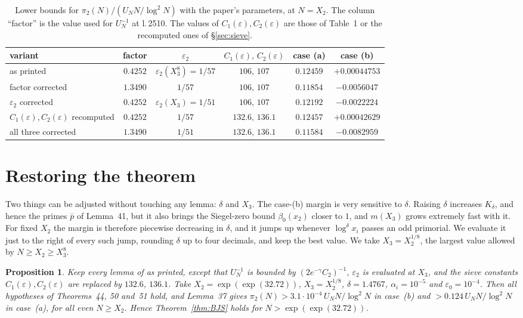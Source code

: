 \documentclass[11pt,a4paper]{amsart}
\newtheorem{proposition}[theorem]{Proposition}
\theoremstyle{remark}
\newcommand{\eps}{\varepsilon}
\newcommand{\BJS}{\cite{BJS}}
\begin{document}
\begin{table}[ht]
\caption{Lower bounds for $\pi_2(N)/(U_NN/\log^2N)$ with the paper's parameters, at $N=X_2$. The column
``factor'' is the value used for $U_N^{-1}$ at l.\,2510. The values of $C_1(\eps),C_2(\eps)$ are those of
Table~1 or the recomputed ones of \S\ref{sec:sieve}.}
\label{tab:variants}
\centering\small
\begin{tabular}{@{}lccccc@{}}
\toprule
variant & factor & $\eps_2$ & $C_1(\eps),\,C_2(\eps)$ & case (a) & case (b) \\
\midrule
as printed & $0.4252$ & $\eps_2(X_3^8)=1/57$ & $106,\,107$ & $0.12459$ & $+0.00044753$ \\
factor corrected & $1.3490$ & $1/57$ & $106,\,107$ & $0.11854$ & $-0.0056047$ \\
$\eps_2$ corrected & $0.4252$ & $\eps_2(X_3)=1/51$ & $106,\,107$ & $0.12192$ & $-0.0022224$ \\
$C_1(\eps),C_2(\eps)$ recomputed & $0.4252$ & $1/57$ & $132.6,\,136.1$ & $0.12457$ & $+0.00042629$ \\
all three corrected & $1.3490$ & $1/51$ & $132.6,\,136.1$ & $0.11584$ & $-0.0082959$ \\
\bottomrule
\end{tabular}
\end{table}

\section{Restoring the theorem}\label{sec:restore}

Two things can be adjusted without touching any lemma: $\delta$ and $X_3$. The case-(b) margin is very sensitive
to $\delta$. Raising $\delta$ increases $K_\delta$, and hence the primes $\bar p$ of Lemma~41, but it also brings
the Siegel-zero bound $\beta_0(x_2)$ closer to $1$, and $m(X_3)$ grows extremely fast with it. For fixed
$X_2$ the margin is therefore piecewise decreasing in $\delta$, and it jumps up whenever
$\log^{\delta}x_i$ passes an odd primorial. We evaluate it just to the right of every such jump, rounding
$\delta$ up to four decimals, and keep the best value. We take $X_3=X_2^{1/8}$, the largest value allowed by
$N\ge X_2\ge X_3^8$.

\begin{proposition}\label{prop:A}
Keep every lemma of \BJS{} as printed, except that $U_N^{-1}$ is bounded by $(2e^{-\gamma}C_2)^{-1}$, $\eps_2$ is
evaluated at $X_3$, and the sieve constants $C_1(\eps),C_2(\eps)$ are replaced by $132.6$, $136.1$. Take $X_2=\exp(\exp(32.72))$,
$X_3=X_2^{1/8}$, $\delta=1.4767$, $\alpha_i=10^{-5}$ and $\eps_0=10^{-4}$. Then all hypotheses of
Theorems~44, 50 and~51 hold, and Lemma~37 gives
$\pi_2(N)>3.1\cdot10^{-4}\,U_NN/\log^2N$ in case~(b) and $>0.124\,U_NN/\log^2N$ in case~(a), for all even
$N\ge X_2$. Hence Theorem~\ref{thm:BJS} holds for $N>\exp(\exp(32.72))$.
\end{proposition}
\end{document}
